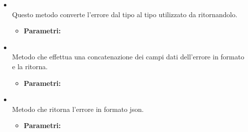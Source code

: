 \begin{itemize}
\item[] \textbf{} \\ Questo metodo converte l'errore dal tipo  al tipo  utilizzato da  ritornandolo.
\begin{itemize}\addtolength{\itemsep}{-0.5\baselineskip}
\item[] \textbf{Parametri:}
\end{itemize}
\item[] \textbf{} \\ Metodo che effettua una concatenazione dei campi dati dell'errore in formato  e la ritorna.
\begin{itemize}\addtolength{\itemsep}{-0.5\baselineskip}
\item[] \textbf{Parametri:}
\end{itemize}
\item[] \textbf{} \\ Metodo che ritorna l'errore in formato json.
\begin{itemize}\addtolength{\itemsep}{-0.5\baselineskip}
\item[] \textbf{Parametri:}
\end{itemize}
\end{itemize}
